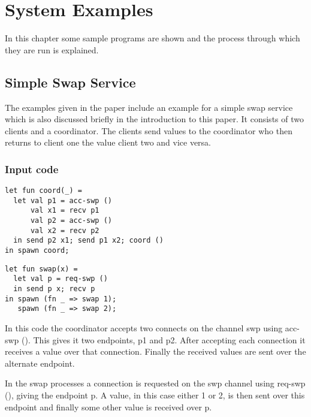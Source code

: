 \chapter{System Examples} \label{examplesChapt}

In this chapter some sample programs are shown and the process through which they are run is explained. 

\section{Simple Swap Service}

The examples given in the paper \cite{paper1} include an example for a simple swap service which is also discussed briefly in the introduction to this paper. It consists of two clients and a coordinator. The clients send values to the coordinator who then returns to client one the value client two and vice versa.

\subsection{Input code}

\begin{minipage}{.45\textwidth}
\begin{lstlisting}[backgroundcolor=\color{white},numbers=none]
let fun coord(_) =
  let val p1 = acc-swp ()
      val x1 = recv p1
      val p2 = acc-swp ()
      val x2 = recv p2
  in send p2 x1; send p1 x2; coord ()
in spawn coord;
\end{lstlisting}
\end{minipage}
\hfill
\begin{minipage}{.45\textwidth}
\begin{lstlisting}[backgroundcolor=\color{white},numbers=none]
let fun swap(x) =
  let val p = req-swp ()
  in send p x; recv p
in spawn (fn _ => swap 1);
   spawn (fn _ => swap 2);
\end{lstlisting}
\vspace{2em}
\end{minipage} 

In this code the coordinator accepts two connects on the channel swp using acc-swp (). This gives it two endpoints, p1 and p2. After accepting each connection it receives a value over that connection. Finally the received values are sent over the alternate endpoint. 

In the swap processes a connection is requested on the swp channel using req-swp (), giving the endpoint p. A value, in this case either 1 or 2, is then sent over this endpoint and finally some other value is received over p. 

